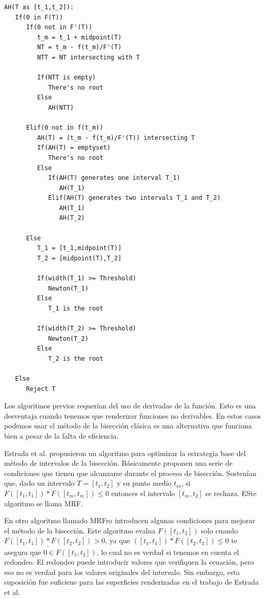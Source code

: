 \begin{verbatim}
AH(T as [t_1,t_2]):
   If(0 in F(T))
      If(0 not in F'(T))
         t_m = t_1 + midpoint(T)
         NT = t_m - f(t_m)/F'(T)
         NTT = NT intersecting with T
        
         If(NTT is empty)
            There's no root
         Else
            AH(NTT)
       
      Elif(0 not in f(t_m))
         AH(T) = (t_m - f(t_m)/F'(T)) intersecting T
         If(AH(T) = emptyset)
            There's no root
         Else
            If(AH(T) generates one interval T_1)
               AH(T_1)
            Elif(AH(T) generates two intervals T_1 and T_2)
               AH(T_1)
               AH(T_2)
         
      Else
         T_1 = [t_1,midpoint(T)]
         T_2 = [midpoint(T),T_2]         
         
         If(width(T_1) >= Threshold)
            Newton(T_1)
         Else
            T_1 is the root
            
         If(width(T_2) >= Threshold)
            Newton(T_2)
         Else
            T_2 is the root
         
   Else
      Reject T
\end{verbatim}

Los algoritmos previos requerían del uso de derivadas de la función. Esto es una desventaja cuando tenemos que renderizar funciones no derivables. En estos casos podemos usar el método de la bisección clásica es una alternativa que funciona bien a pesar de la falta de eficiencia.
\par Estrada et al. \cite{Estrada03}  propusieron un algoritmo para optimizar la estrategia base del método de intervalos de la bisección. Básicamente proponen una serie de condiciones que tienen que alcanzarse durante el proceso de bisección. Sostenían que, dado un intervalo $T = [t_1,t_2]$ y su punto medio $t_m$, si $\overline{F([t_1,t_1])*F([t_m,t_m])} \leq 0$ entonces el intervalo $[t_m,t_2]$ se rechaza. ESte algoritmo se llama MRF.
\par En otro algoritmo llamado MRFro \cite{Estrada03} introducen algunas condiciones para mejorar el método de la bisección. Este algoritmo evalua $F([t_1,t_2])$ solo cuando $\underline{F([t_1,t_1])*F([t_2,t_2])} > 0$, ya que $\overline{([t_1,t_1])*F([t_2,t_2])} \leq 0$ te asegura que $0 \in F([t_1,t_2])$, lo cual no es verdad si tenemos en cuenta el redondeo. El redondeo puede introducir  valores que verifiquen la ecuación, pero eso no es verdad para los valores originales del intervalo. Sin embargo, esta suposición fue suficiene para las superficies renderizadas en el trabajo de Estrada et al.


